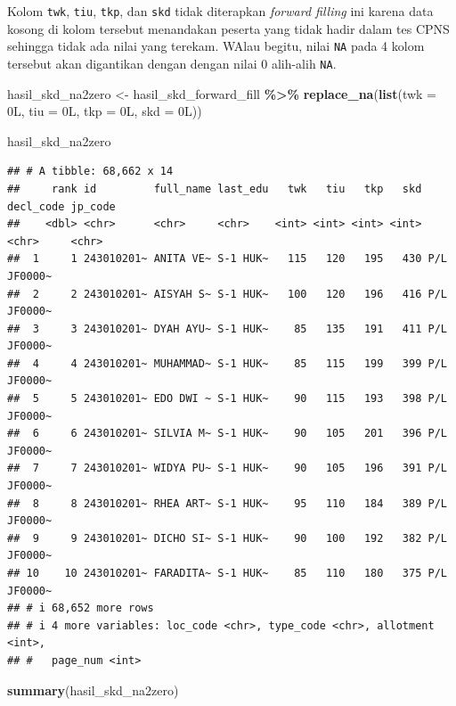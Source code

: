 \documentclass[
]{article}
\newenvironment{Shaded}{\begin{snugshade}}{\end{snugshade}}
\newcommand{\AttributeTok}[1]{\textcolor[rgb]{0.13,0.29,0.53}{#1}}
\newcommand{\DataTypeTok}[1]{\textcolor[rgb]{0.13,0.29,0.53}{#1}}
\newcommand{\DecValTok}[1]{\textcolor[rgb]{0.00,0.00,0.81}{#1}}
\newcommand{\FunctionTok}[1]{\textcolor[rgb]{0.13,0.29,0.53}{\textbf{#1}}}
\newcommand{\NormalTok}[1]{#1}
\newcommand{\OtherTok}[1]{\textcolor[rgb]{0.56,0.35,0.01}{#1}}
\newcommand{\SpecialCharTok}[1]{\textcolor[rgb]{0.81,0.36,0.00}{\textbf{#1}}}
\begin{document}
Kolom \texttt{twk}, \texttt{tiu}, \texttt{tkp}, dan \texttt{skd} tidak
diterapkan \emph{forward filling} ini karena data kosong di kolom
tersebut menandakan peserta yang tidak hadir dalam tes CPNS sehingga
tidak ada nilai yang terekam. WAlau begitu, nilai \texttt{NA} pada 4
kolom tersebut akan digantikan dengan dengan nilai 0 alih-alih
\texttt{NA}.

\begin{Shaded}
\begin{Highlighting}[]
\NormalTok{hasil\_skd\_na2zero }\OtherTok{\textless{}{-}}\NormalTok{ hasil\_skd\_forward\_fill }\SpecialCharTok{\%\textgreater{}\%} 
  \FunctionTok{replace\_na}\NormalTok{(}\FunctionTok{list}\NormalTok{(}\AttributeTok{twk =} \DecValTok{0}\DataTypeTok{L}\NormalTok{,}
                  \AttributeTok{tiu =} \DecValTok{0}\DataTypeTok{L}\NormalTok{,}
                  \AttributeTok{tkp =} \DecValTok{0}\DataTypeTok{L}\NormalTok{,}
                  \AttributeTok{skd =} \DecValTok{0}\DataTypeTok{L}\NormalTok{))}

\NormalTok{hasil\_skd\_na2zero}
\end{Highlighting}
\end{Shaded}

\begin{verbatim}
## # A tibble: 68,662 x 14
##     rank id         full_name last_edu   twk   tiu   tkp   skd decl_code jp_code
##    <dbl> <chr>      <chr>     <chr>    <int> <int> <int> <int> <chr>     <chr>  
##  1     1 243010201~ ANITA VE~ S-1 HUK~   115   120   195   430 P/L       JF0000~
##  2     2 243010201~ AISYAH S~ S-1 HUK~   100   120   196   416 P/L       JF0000~
##  3     3 243010201~ DYAH AYU~ S-1 HUK~    85   135   191   411 P/L       JF0000~
##  4     4 243010201~ MUHAMMAD~ S-1 HUK~    85   115   199   399 P/L       JF0000~
##  5     5 243010201~ EDO DWI ~ S-1 HUK~    90   115   193   398 P/L       JF0000~
##  6     6 243010201~ SILVIA M~ S-1 HUK~    90   105   201   396 P/L       JF0000~
##  7     7 243010201~ WIDYA PU~ S-1 HUK~    90   105   196   391 P/L       JF0000~
##  8     8 243010201~ RHEA ART~ S-1 HUK~    95   110   184   389 P/L       JF0000~
##  9     9 243010201~ DICHO SI~ S-1 HUK~    90   100   192   382 P/L       JF0000~
## 10    10 243010201~ FARADITA~ S-1 HUK~    85   110   180   375 P/L       JF0000~
## # i 68,652 more rows
## # i 4 more variables: loc_code <chr>, type_code <chr>, allotment <int>,
## #   page_num <int>
\end{verbatim}

\begin{Shaded}
\begin{Highlighting}[]
\FunctionTok{summary}\NormalTok{(hasil\_skd\_na2zero)}
\end{Highlighting}
\end{Shaded}
\end{document}

